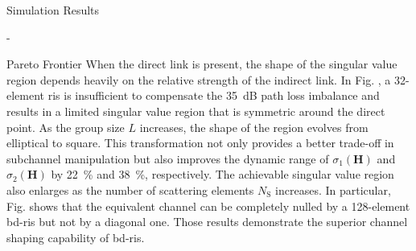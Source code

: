 \begin{section}{Simulation Results}
\begin{subsection}{-}
\begin{subsubsection}{Pareto Frontier}
			When the direct link is present, the shape of the singular value region depends heavily on the relative strength of the indirect link.
			In Fig. , a 32-element \gls{ris} is insufficient to compensate the \qty{35}{dB} path loss imbalance and results in a limited singular value region that is symmetric around the direct point.
			As the group size $L$ increases, the shape of the region evolves from elliptical to square.
			This transformation not only provides a better trade-off in subchannel manipulation but also improves the dynamic range of $\sigma_1(\mathbf{H})$ and $\sigma_2(\mathbf{H})$ by \qty{22}{\percent} and \qty{38}{\percent}, respectively.
			The achievable singular value region also enlarges as the number of scattering elements $N_\mathrm{S}$ increases.
			In particular, Fig.  shows that the equivalent channel can be completely nulled by a 128-element \gls{bd}-\gls{ris} but not by a diagonal one.
			Those results demonstrate the superior channel shaping capability of \gls{bd}-\gls{ris}.
		\end{subsubsection}


\end{subsection}
\end{section}
